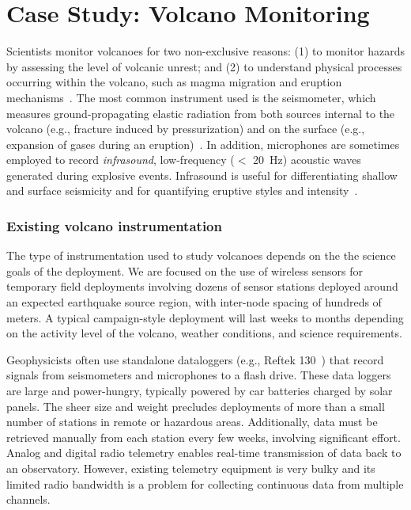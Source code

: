 \chapter{Case Study: Volcano Monitoring}
\label{chapter-background}


Scientists monitor volcanoes for two non-exclusive reasons: (1) to monitor
hazards by assessing the level of volcanic unrest; and (2) to understand
physical processes occurring within the volcano, such as magma migration and
eruption mechanisms~\cite{scarpa-96,mcnutt-96}.  The most common instrument
used is the seismometer, which measures ground-propagating elastic radiation
from both sources internal to the volcano (e.g., fracture induced by
pressurization) and on the surface (e.g., expansion of gases during an
eruption)~\cite{mcnutt-96}.  In addition, microphones are sometimes employed
to record {\em infrasound}, low-frequency ($<$ 20~Hz) acoustic waves
generated during explosive events.  Infrasound is useful for differentiating
shallow and surface seismicity and for quantifying eruptive styles and
intensity~\cite{johnson-etal-04b}.

\subsection{Existing volcano instrumentation}

The type of instrumentation used to study volcanoes depends on the the
science goals of the deployment. We are focused on the use of wireless
sensors for temporary field deployments involving dozens of sensor stations
deployed around an expected earthquake source region, with inter-node spacing
of hundreds of meters. A typical campaign-style deployment will last weeks to
months depending on the activity level of the volcano, weather conditions,
and science requirements.

Geophysicists often use standalone dataloggers (e.g., Reftek
130~\cite{reftek}) that record signals from seismometers and microphones to a
flash drive.  These data loggers are large and power-hungry, typically
powered by car batteries charged by solar panels.  The sheer size and weight
precludes deployments of more than a small number of stations in remote or
hazardous areas. Additionally, data must be retrieved manually from each
station every few weeks, involving significant effort. Analog and digital
radio telemetry enables real-time transmission of data back to an
observatory.  However, existing telemetry equipment is very bulky and its
limited radio bandwidth is a problem for collecting continuous data from
multiple channels.

